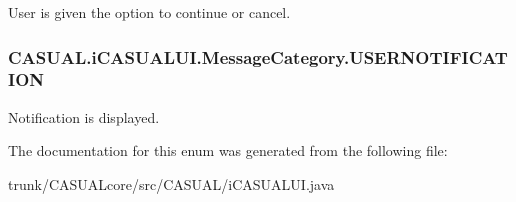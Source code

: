 User is given the option to continue or cancel. \hypertarget{enum_c_a_s_u_a_l_1_1i_c_a_s_u_a_l_u_i_1_1_message_category_aec7dcf1fbd8c8165be2687ff7fe4a900}{
\subsubsection[{U\-S\-E\-R\-N\-O\-T\-I\-F\-I\-C\-A\-T\-I\-O\-N}]{\setlength{\rightskip}{0pt plus 5cm}C\-A\-S\-U\-A\-L.\-i\-C\-A\-S\-U\-A\-L\-U\-I.\-Message\-Category.\-U\-S\-E\-R\-N\-O\-T\-I\-F\-I\-C\-A\-T\-I\-O\-N}}\label{enum_c_a_s_u_a_l_1_1i_c_a_s_u_a_l_u_i_1_1_message_category_aec7dcf1fbd8c8165be2687ff7fe4a900}
Notification is displayed. 

The documentation for this enum was generated from the following file\-:\begin{DoxyCompactItemize}
\item 
trunk/\-C\-A\-S\-U\-A\-Lcore/src/\-C\-A\-S\-U\-A\-L/i\-C\-A\-S\-U\-A\-L\-U\-I.\-java\end{DoxyCompactItemize}
